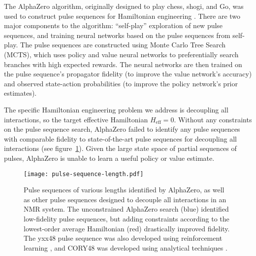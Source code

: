 \documentclass{article}
\begin{document}
The AlphaZero algorithm, originally designed to play chess, shogi, and Go, was used to construct pulse sequences for Hamiltonian engineering \cite{Silver1140}. There are two major components to the algorithm: ``self-play'' exploration of new pulse sequences, and training neural networks based on the pulse sequences from self-play. The pulse sequences are constructed using Monte Carlo Tree Search (MCTS), which uses policy and value neural networks to preferentially search branches with high expected rewards. The neural networks are then trained on the pulse sequence's propagator fidelity (to improve the value network's accuracy) and observed state-action probabilities (to improve the policy network's prior estimates).

%     

The specific Hamiltonian engineering problem we address is decoupling all interactions, so the target effective Hamiltonian $H_{\text{eff}} = 0$. Without any constraints on the pulse sequence search, AlphaZero failed to identify any pulse sequences with comparable fidelity to state-of-the-art pulse sequences for decoupling all interactions (see figure~\ref{fig:fidelity-length}). Given the large state space of partial sequences of pulses, AlphaZero is unable to learn a useful policy or value estimate.

\begin{figure}[H]
    \centering
    \texttt{[image: pulse-sequence-length.pdf]}
    \caption{Pulse sequences of various lengths identified by AlphaZero, as well as other pulse sequences designed to decouple all interactions in an NMR system. The unconstrained AlphaZero search (blue) identified low-fidelity pulse sequences, but adding constraints according to the lowest-order average Hamiltonian (red) drastically improved fidelity. The yxx48 pulse sequence was also developed using reinforcement learning \cite{peng2021deep}, and CORY48 was developed using analytical techniques \cite{CORY1990205}.}
    \label{fig:fidelity-length}
\end{figure}
\end{document}
